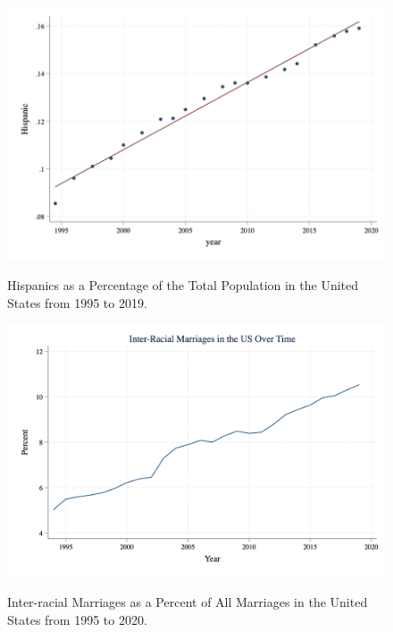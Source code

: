 \documentclass[12pt, fullpage]{article}
\begin{document}
\pagebreak
\newpage

\begin{figure}[H]
\begin{center}
\caption{Hispanics as a Percentage of the Total Population in the United States from 1995 to 2019.}
\includegraphics[width=\textwidth]{HispanicUSA.png} 
\label{fig:2}
\end{center}
\end{figure}

\pagebreak
\newpage

\begin{figure}[H]
\begin{center}
\caption{Inter-racial Marriages as a Percent of All Marriages in the United States from 1995 to 2020.}
\includegraphics[width=\textwidth]{interracialovertime.png} 
\label{fig:3}
\end{center}
\end{figure}
\end{document}
